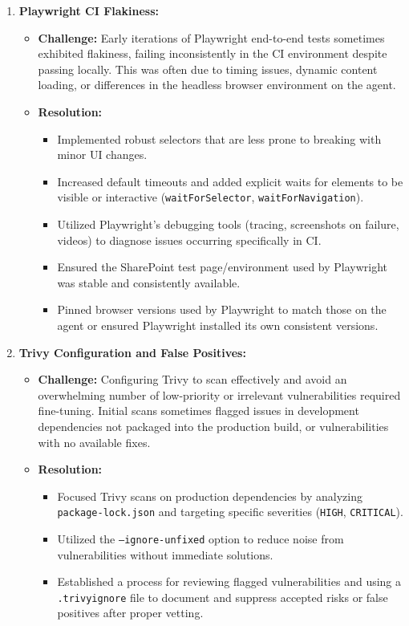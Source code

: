 \begin{enumerate}
    \item \textbf{Playwright CI Flakiness:}
    \begin{itemize}
        \item \textbf{Challenge:} Early iterations of Playwright end-to-end tests sometimes exhibited flakiness, failing inconsistently in the CI environment despite passing locally. This was often due to timing issues, dynamic content loading, or differences in the headless browser environment on the agent.
        \item \textbf{Resolution:}
        \begin{itemize}
            \item Implemented robust selectors that are less prone to breaking with minor UI changes.
            \item Increased default timeouts and added explicit waits for elements to be visible or interactive (\texttt{waitForSelector}, \texttt{waitForNavigation}).
            \item Utilized Playwright's debugging tools (tracing, screenshots on failure, videos) to diagnose issues occurring specifically in CI.
            \item Ensured the SharePoint test page/environment used by Playwright was stable and consistently available.
            \item Pinned browser versions used by Playwright to match those on the agent or ensured Playwright installed its own consistent versions.
        \end{itemize}
    \end{itemize}

    \item \textbf{Trivy Configuration and False Positives:}
    \begin{itemize}
        \item \textbf{Challenge:} Configuring Trivy to scan effectively and avoid an overwhelming number of low-priority or irrelevant vulnerabilities required fine-tuning. Initial scans sometimes flagged issues in development dependencies not packaged into the production build, or vulnerabilities with no available fixes.
        \item \textbf{Resolution:}
        \begin{itemize}
            \item Focused Trivy scans on production dependencies by analyzing \texttt{package-lock.json} and targeting specific severities (\texttt{HIGH}, \texttt{CRITICAL}).
            \item Utilized the \texttt{--ignore-unfixed} option to reduce noise from vulnerabilities without immediate solutions.
            \item Established a process for reviewing flagged vulnerabilities and using a \texttt{.trivyignore} file to document and suppress accepted risks or false positives after proper vetting.
        \end{itemize}
    \end{itemize}


\end{enumerate}
